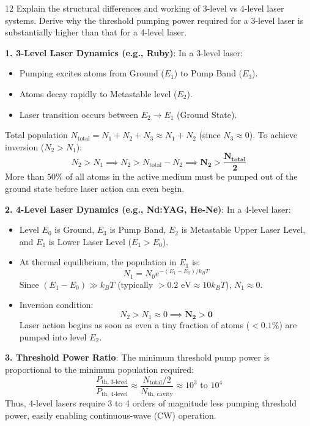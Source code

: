 \begin{theoryq}{12}
Explain the structural differences and working of 3-level vs 4-level laser systems. Derive why the threshold pumping power required for a 3-level laser is substantially higher than that for a 4-level laser.
\end{theoryq}
\begin{theorysol}
\textbf{1. 3-Level Laser Dynamics (e.g., Ruby)}:
In a 3-level laser:
\begin{itemize}
    \item Pumping excites atoms from Ground ($E_1$) to Pump Band ($E_3$).
    \item Atoms decay rapidly to Metastable level ($E_2$).
    \item Laser transition occurs between $E_2 \to E_1$ (Ground State).
\end{itemize}
Total population $N_{\text{total}} = N_1 + N_2 + N_3 \approx N_1 + N_2$ (since $N_3 \approx 0$).
To achieve inversion ($N_2 > N_1$):
\begin{equation}
N_2 > N_1 \implies N_2 > N_{\text{total}} - N_2 \implies \mathbf{N_2 > \frac{N_{\text{total}}}{2}}
\end{equation}
More than $50\%$ of all atoms in the active medium must be pumped out of the ground state before laser action can even begin.

\textbf{2. 4-Level Laser Dynamics (e.g., Nd:YAG, He-Ne)}:
In a 4-level laser:
\begin{itemize}
    \item Level $E_0$ is Ground, $E_3$ is Pump Band, $E_2$ is Metastable Upper Laser Level, and $E_1$ is Lower Laser Level ($E_1 > E_0$).
    \item At thermal equilibrium, the population in $E_1$ is:
    \begin{equation}
    N_1 = N_0 e^{-(E_1 - E_0)/k_BT}
    \end{equation}
    Since $(E_1 - E_0) \gg k_BT$ (typically $> 0.2\text{ eV} \approx 10 k_BT$), $N_1 \approx 0$.
    \item Inversion condition:
    \begin{equation}
    N_2 > N_1 \approx 0 \implies \mathbf{N_2 > 0}
    \end{equation}
    Laser action begins as soon as even a tiny fraction of atoms ($< 0.1\%$) are pumped into level $E_2$.
\end{itemize}

\textbf{3. Threshold Power Ratio}:
The minimum threshold pump power is proportional to the minimum population required:
\begin{equation}
\frac{P_{\text{th, 3-level}}}{P_{\text{th, 4-level}}} \approx \frac{N_{\text{total}}/2}{N_{\text{th, cavity}}} \approx 10^3 \text{ to } 10^4
\end{equation}
Thus, 4-level lasers require 3 to 4 orders of magnitude less pumping threshold power, easily enabling continuous-wave (CW) operation.
\end{theorysol}
\vspace{4mm}

